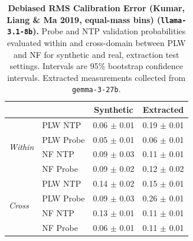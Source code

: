\begin{table}[ht]
\centering
\begin{tabular}{ll cc}
\toprule
& & Synthetic & Extracted \\
\midrule
\multirow{4}{*}{\textit{Within}}
& PLW NTP & 0.06 $\pm$ 0.01 & 0.19 $\pm$ 0.01 \\
& PLW Probe & 0.05 $\pm$ 0.01 & 0.06 $\pm$ 0.01 \\
& NF NTP & 0.09 $\pm$ 0.03 & 0.11 $\pm$ 0.01 \\
& NF Probe & 0.09 $\pm$ 0.02 & 0.12 $\pm$ 0.02 \\
\midrule
\multirow{4}{*}{\textit{Cross}}
& PLW NTP & 0.14 $\pm$ 0.02 & 0.15 $\pm$ 0.01 \\
& PLW Probe & 0.09 $\pm$ 0.03 & 0.26 $\pm$ 0.01 \\
& NF NTP & 0.13 $\pm$ 0.01 & 0.11 $\pm$ 0.01 \\
& NF Probe & 0.06 $\pm$ 0.01 & 0.11 $\pm$ 0.01 \\
\bottomrule
\end{tabular}
\caption{\textbf{Debiased RMS Calibration Error (Kumar, Liang \& Ma 2019, equal-mass bins) (\texttt{llama-3.1-8b}).} Probe and NTP validation probabilities evaluated within and cross-domain between PLW and NF for synthetic and real, extraction test settings. Intervals are 95\% bootstrap confidence intervals. Extracted measurements collected from \texttt{gemma-3-27b}.}
\label{tab:llama-3.1-8b-gemma-3-27b-pond_nfix-rmsce_db}
\end{table}
